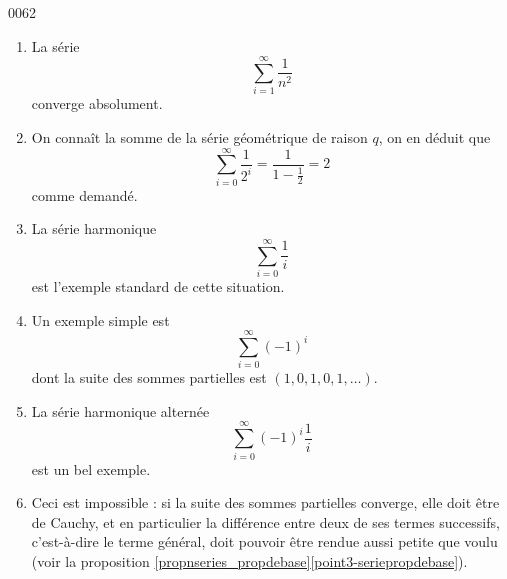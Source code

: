 
\begin{corrige}{0062}

\begin{enumerate}

\item
La série
\begin{equation*}
	\sum_{i=1}^\infty \frac{1}{n^2}
\end{equation*}
converge absolument.

\item
On connaît la somme de la série géométrique de raison $q$, on en
  déduit que
  \begin{equation*}
    \sum_{i=0}^\infty \frac1{2^i} = \frac1{1-\frac12} = 2
  \end{equation*}
  comme demandé.

\item
La série harmonique
  \begin{equation*}
    \sum_{i=0}^\infty \frac1i
  \end{equation*}
  est l'exemple standard de cette situation.

\item
Un exemple simple est
  \begin{equation*}
    \sum_{i=0}^\infty {(-1)^i}
  \end{equation*}
  dont la suite des sommes partielles est $(1, 0, 1, 0, 1, \ldots)$.

\item
La série harmonique alternée
  \begin{equation*}
    \sum_{i=0}^\infty {(-1)}^i\frac1i
  \end{equation*}
  est un bel exemple.

\item
Ceci est impossible : si la suite des sommes partielles converge, elle doit être de Cauchy, et en particulier la différence entre deux de ses termes successifs, c'est-à-dire le terme général, doit pouvoir être rendue aussi petite que voulu 
(voir la proposition \ref{propnseries_propdebase}\ref{point3-seriepropdebase}).  \end{enumerate}


\end{corrige}
